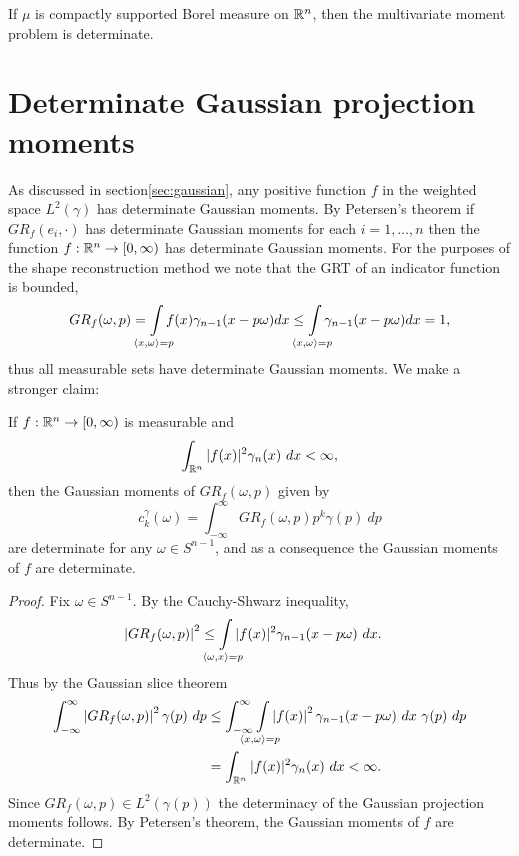 
\begin{corollary}
  If $\mu$ is compactly supported Borel measure on $\mathbb{R}^n$, then the multivariate moment problem is determinate.
\end{corollary}


\section{Determinate Gaussian projection moments}
\label{sec:GRTdeterminacy}

As discussed in section\ref{sec:gaussian}, any positive function $f$ in the weighted space $L^2(\gamma)$ has determinate Gaussian moments. By Petersen's theorem if $GR_f(e_i, \cdot)$ has determinate Gaussian moments for each $i = 1, \ldots, n$ then the function $f: \mathbb{R}^n \to [0, \infty)$ has determinate Gaussian moments. For the purposes of the shape reconstruction method we note that the GRT of an indicator function is bounded,
\[
  GR_f(\omega, p) = \int\mclimits_{\inner{x, \omega} = p} f(x)\gamma_{n-1}(x - p\omega)dx \leq \int\mclimits_{\inner{x, \omega} = p} \gamma_{n-1}(x - p\omega)dx = 1,
\]
thus all measurable sets have determinate Gaussian moments. We make a stronger claim: 

\begin{theorem}
  If $f : \mathbb{R}^n \to [0, \infty)$ is measurable and
  \[
    \int_{\mathbb{R}^n} |f(x)|^2 \gamma_n(x) ~dx < \infty,
  \]
  then the Gaussian moments of $GR_f(\omega, p)$ given by
  \[
    c^\gamma_k(\omega) = \int_{-\infty}^\infty GR_f(\omega, p) p^k \gamma(p) ~dp
  \]
  are determinate for any $\omega \in S^{n-1}$, and as a consequence the Gaussian moments of $f$ are determinate.
\end{theorem}

\begin{proof}
  Fix $\omega \in S^{n-1}$. By the Cauchy-Shwarz inequality,
  \begin{align*}
    \left|GR_f(\omega, p)\right|^2 
    &\leq \int\mclimits_{\inner{\omega, x} = p} |f(x)|^2 \gamma_{n-1}(x - p\omega) ~ dx.
  \end{align*}
  Thus by the Gaussian slice theorem 
  \begin{align*}
    \int_{-\infty}^\infty \left|GR_f(\omega, p)\right|^2 \gamma(p) ~dp 
    &\leq \int_{-\infty}^\infty \int\mclimits_{\inner{x, \omega} = p} \left|f(x)\right|^2 \gamma_{n-1}(x - p\omega) ~dx ~ \gamma(p) ~dp \\
    &= \int_{\RR^n} |f(x)|^2 \gamma_n(x) ~dx < \infty.
  \end{align*}
  Since $GR_f(\omega, p) \in L^2(\gamma(p))$ the determinacy of the Gaussian projection moments follows. By Petersen's theorem, the Gaussian moments of $f$ are determinate.
\end{proof}



